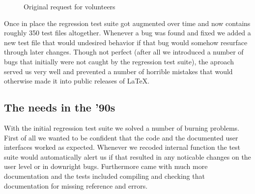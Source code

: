 \documentclass[a4paper]{ltugboat}
\begin{document}
\begin{figure}
\centering
{}
\caption{Original request for volunteers}\label{fig:volunteers}
\end{figure}

Once in place the regression test suite got augmented over time and
now contains roughly 350 test files altogether. Whenever a bug was
found and fixed we added a new test file that would undesired behavior
if that bug would somehow resurface through later changes. Though not
perfect (after all we introduced a number of bugs that initially were
not caught by the regression test suite), the aproach served us very
well and prevented a number of horrible mistakes that would otherwise
made it into public releases of \LaTeX.

\subsection{The needs in the '90s}

With the initial regression test suite we solved a number of burning
problems. First of all we wanted to be confident that the code and the
documented user interfaces worked as expected. Whenever we recoded
internal function the test suite would automatically alert us if that
resulted in any noticable changes on the user level or in downright
bugs. Furthermore \LaTeXe{} came with much more documentation and the
tests included compiling and checking that documentation for missing
reference and errors.
\end{document}
